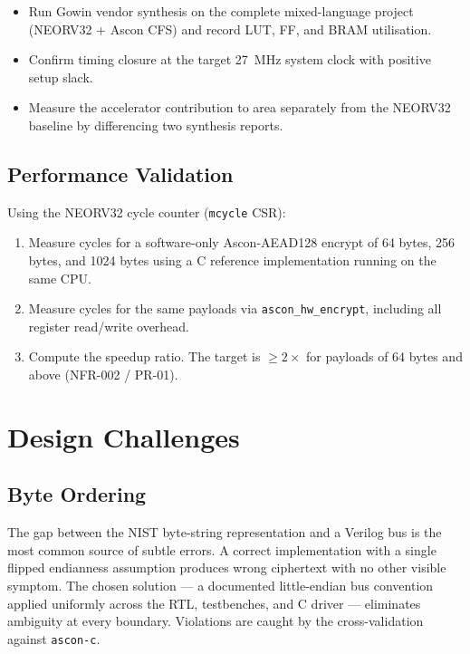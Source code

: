 \documentclass[11pt,a4paper]{article}
\begin{document}
\begin{itemize}
  \item Run Gowin vendor synthesis on the complete mixed-language project
        (NEORV32 + Ascon CFS) and record LUT, FF, and BRAM utilisation.
  \item Confirm timing closure at the target 27~MHz system clock with positive
        setup slack.
  \item Measure the accelerator contribution to area separately from the
        NEORV32 baseline by differencing two synthesis reports.
\end{itemize}

\subsection{Performance Validation}

Using the NEORV32 cycle counter (\texttt{mcycle} CSR):

\begin{enumerate}
  \item Measure cycles for a software-only Ascon-AEAD128 encrypt of
        64 bytes, 256 bytes, and 1024 bytes using a C reference
        implementation running on the same CPU.
  \item Measure cycles for the same payloads via \texttt{ascon\_hw\_encrypt},
        including all register read/write overhead.
  \item Compute the speedup ratio. The target is $\geq 2\times$ for
        payloads of 64 bytes and above (NFR-002 / PR-01).
\end{enumerate}

\section{Design Challenges}
\label{sec:challenges}

\subsection{Byte Ordering}

The gap between the NIST byte-string representation and a Verilog bus is
the most common source of subtle errors. A correct implementation with a
single flipped endianness assumption produces wrong ciphertext with no
other visible symptom. The chosen solution --- a documented little-endian
bus convention applied uniformly across the RTL, testbenches, and C driver
--- eliminates ambiguity at every boundary. Violations are caught by the
cross-validation against \texttt{ascon-c}.
\end{document}
